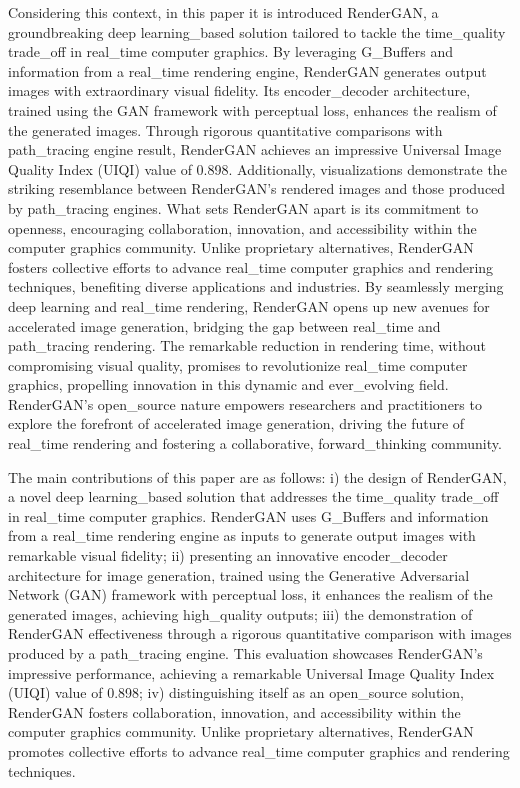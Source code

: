 Considering this context, in this paper it is introduced RenderGAN, a groundbreaking deep learning_based solution tailored to tackle the time_quality trade_off in real_time computer graphics. By leveraging G_Buffers and information from a real_time rendering engine, RenderGAN generates output images with extraordinary visual fidelity. Its encoder_decoder architecture, trained using the GAN framework with perceptual loss, enhances the realism of the generated images. Through rigorous quantitative comparisons with path_tracing engine result, RenderGAN achieves an impressive Universal Image Quality Index (UIQI) value of 0.898. Additionally, visualizations demonstrate the striking resemblance between RenderGAN's rendered images and those produced by path_tracing engines. What sets RenderGAN apart is its commitment to openness, encouraging collaboration, innovation, and accessibility within the computer graphics community. Unlike proprietary alternatives, RenderGAN fosters collective efforts to advance real_time computer graphics and rendering techniques, benefiting diverse applications and industries. By seamlessly merging deep learning and real_time rendering, RenderGAN opens up new avenues for accelerated image generation, bridging the gap between real_time and path_tracing rendering. The remarkable reduction in rendering time, without compromising visual quality, promises to revolutionize real_time computer graphics, propelling innovation in this dynamic and ever_evolving field. RenderGAN's open_source nature empowers researchers and practitioners to explore the forefront of accelerated image generation, driving the future of real_time rendering and fostering a collaborative, forward_thinking community.

The main contributions of this paper are as follows: i) the design of RenderGAN, a novel deep learning_based solution that addresses the time_quality trade_off in real_time computer graphics. RenderGAN uses G_Buffers and information from a real_time rendering engine as inputs to generate output images with remarkable visual fidelity; ii) presenting an innovative encoder_decoder architecture for image generation, trained using the Generative Adversarial Network (GAN) framework with perceptual loss, it enhances the realism of the generated images, achieving high_quality outputs; iii) the demonstration of RenderGAN effectiveness  through a rigorous quantitative comparison with images produced by a path_tracing engine. This evaluation showcases RenderGAN's impressive performance, achieving a remarkable Universal Image Quality Index (UIQI) value of 0.898; iv) distinguishing itself as an open_source solution, RenderGAN fosters collaboration, innovation, and accessibility within the computer graphics community. Unlike proprietary alternatives, RenderGAN promotes collective efforts to advance real_time computer graphics and rendering techniques.

